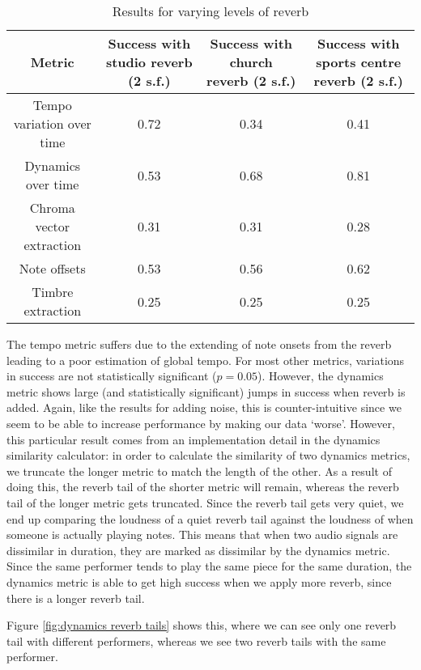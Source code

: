 \documentclass[oneside, class=book, 12pt, crop=false]{standalone}
\begin{document}
\begin{table}[h]
  \centering
  \begin{tabular}{cCCC}
    \textbf{Metric}&\textbf{Success with studio reverb} (2 s.f.)&\textbf{Success with church reverb} (2 s.f.)&\textbf{Success with sports centre reverb} (2 s.f.)\\
        \midrule[0.15em]
        Tempo variation over time & 0.72 & 0.34 &0.41\\
        Dynamics over time&0.53&0.68&0.81\\
        Chroma vector extraction&0.31&0.31&0.28\\
        Note offsets&0.53&0.56&0.62\\
        Timbre extraction&0.25&0.25&0.25\\
  \end{tabular}
  \caption{Results for varying levels of reverb}
  \label{table:reverb results}
\end{table}

The tempo metric suffers due to the extending of note onsets from the reverb leading to a poor estimation of global tempo. For most other metrics, variations in success are not statistically significant ($p=0.05$). However, the dynamics metric shows large (and statistically significant) jumps in success when reverb is added. Again, like the results for adding noise, this is counter-intuitive since we seem to be able to increase performance by making our data `worse'. However, this particular result comes from an implementation detail in the dynamics similarity calculator: in order to calculate the similarity of two dynamics metrics, we truncate the longer metric to match the length of the other. As a result of doing this, the reverb tail of the shorter metric will remain, whereas the reverb tail of the longer metric gets truncated. Since the reverb tail gets very quiet, we end up comparing the loudness of a quiet reverb tail against the loudness of when someone is actually playing notes. This means that when two audio signals are dissimilar in duration, they are marked as dissimilar by the dynamics metric. Since the same performer tends to play the same piece for the same duration, the dynamics metric is able to get high success when we apply more reverb, since there is a longer reverb tail.

Figure \ref{fig:dynamics reverb tails} shows this, where we can see only one reverb tail with different performers, whereas we see two reverb tails with the same performer.
\end{document}
